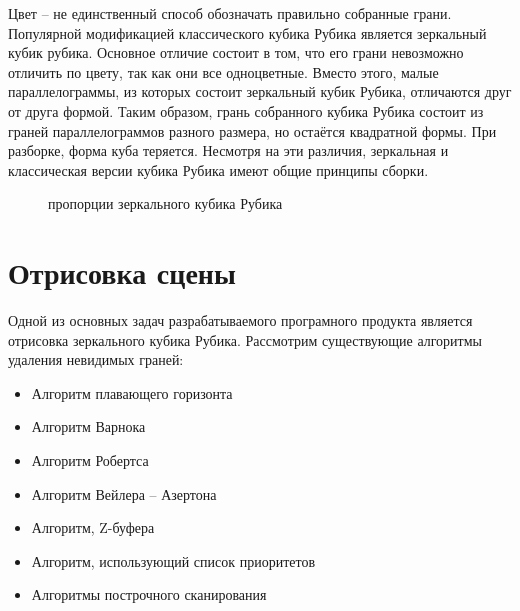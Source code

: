 \documentclass[a4paper, 14pt]{report} %
\begin{document}
	Цвет – не единственный способ обозначать правильно собранные грани. Популярной модификацией классического кубика Рубика является зеркальный кубик рубика. Основное отличие состоит в том, что его грани невозможно отличить по цвету, так как они все одноцветные. Вместо этого, малые параллелограммы, из которых состоит зеркальный кубик Рубика, отличаются друг от друга формой. Таким образом, грань собранного кубика Рубика состоит из граней параллелограммов разного размера, но остаётся квадратной формы. При разборке, форма куба теряется. Несмотря на эти различия, зеркальная и классическая версии кубика Рубика имеют общие принципы сборки.
	
	\begin{figure}[ht]
		\caption{пропорции зеркального кубика Рубика}
		\label{fig:mirrored_cube_proportions}
	\end{figure}

	\section{Отрисовка сцены}
	Одной из основных задач разрабатываемого програмного продукта является отрисовка зеркального кубика Рубика. Рассмотрим существующие алгоритмы удаления невидимых граней:
	\begin{itemize}
		\item Алгоритм плавающего горизонта
		\item Алгоритм Варнока
		\item Алгоритм Робертса
		\item Алгоритм Вейлера – Азертона
		\item Алгоритм, Z-буфера
		\item Алгоритм, использующий список приоритетов
		\item Алгоритмы построчного сканирования
	\end{itemize}
\end{document}
